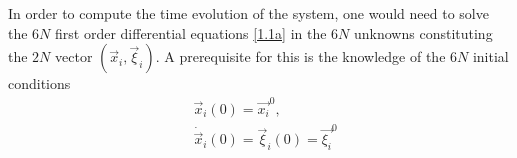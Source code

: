 In order to compute the time evolution of the system, one would need to solve the \(6N\) first order differential equations \eqref{1.1a} in the \(6N\) unknowns constituting the \(2N\) vector \((\vec{x}_i, \vec{\xi}_i)\). A prerequisite for this is the knowledge of the \(6N\) initial conditions
\begin{equation}
    \begin{aligned}
        &\vec{x}_i(0) = \vec{x_i}^0, \\
        &\dot{\vec{x}}_i(0) = \vec{\xi}_i(0) = \vec{\xi_i}^0
    \end{aligned} 
    \label{1.2}
\end{equation}
